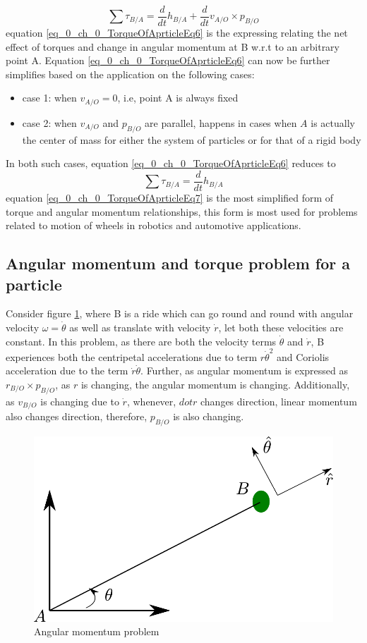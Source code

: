 \begin{equation}\label{eq_0_ch_0_TorqueOfAprticleEq6}
	\sum \tau_{B/A} = \frac{d}{dt} h_{B/A} + \frac{d}{dt} v_{A/O} \times p_{B/O}
\end{equation}
equation \eqref{eq_0_ch_0_TorqueOfAprticleEq6} is the expressing relating the net effect of torques and change in angular momentum at B w.r.t to an arbitrary point A. Equation \eqref{eq_0_ch_0_TorqueOfAprticleEq6} can now be further simplifies based on the application on the following cases:
\begin{itemize}
	\item case 1: when $v_{A/O} = 0$, i.e, point A is always fixed
	\item case 2: when $v_{A/O}$ and $p_{B/O}$ are parallel, happens in cases when $A$ is actually the center of mass for either the system of particles or for that of a rigid body
\end{itemize}
In both such cases, equation \eqref{eq_0_ch_0_TorqueOfAprticleEq6} reduces to
\begin{equation}\label{eq_0_ch_0_TorqueOfAprticleEq7}
\sum \tau_{B/A} = \frac{d}{dt} h_{B/A}
\end{equation}
equation \eqref{eq_0_ch_0_TorqueOfAprticleEq7} is the most simplified form of torque and angular momentum relationships, this form is most used for problems related to motion of wheels in robotics and automotive applications.

\subsection{Angular momentum and torque problem for a particle}

Consider figure \ref{fig_0_ch_0_angularMomentumProb}, where B is a ride which can go round and round with angular velocity $\omega = \dot{\theta}$ as well as translate with velocity $\dot{r}$, let both these velocities are constant. In this problem, as there are both the velocity terms $\dot{\theta}$ and $\dot{r}$, B experiences both the centripetal accelerations due to term $r\dot{\theta}^{2}$ and Coriolis acceleration due to the term $\dot{r}\dot{\theta}$. Further, as angular momentum is expressed as $r_{B/O} \times p_{B/O}$, as $r$ is changing, the angular momentum is changing. Additionally, as $v_{B/O}$ is changing due to $\dot{r}$, whenever, $dot{r}$ changes direction, linear momentum also changes direction, therefore, $p_{B/O}$ is also changing.
\begin{figure}[h!]
	\centering
	\includegraphics[width=0.6\linewidth]{Bilder/13_AngularMomentumProblem1.pdf}
	\caption{Angular momentum problem}
	\label{fig_0_ch_0_angularMomentumProb}
\end{figure}

